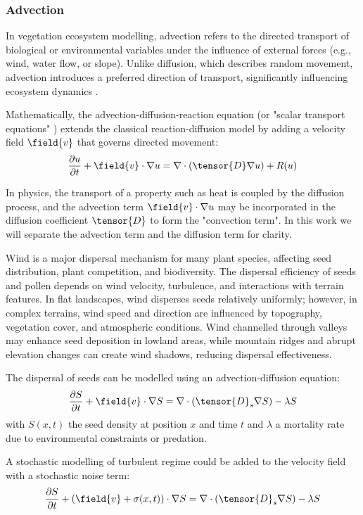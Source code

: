 \subsubsection{Advection}
In vegetation ecosystem modelling, advection refers to the directed transport of biological or environmental variables under the influence of external forces (e.g., wind, water flow, or slope). Unlike diffusion, which describes random movement, advection introduces a preferred direction of transport, significantly influencing ecosystem dynamics \cite{Burger2020}.

Mathematically, the advection-diffusion-reaction equation (or "scalar transport equations" \cite{Baukal2000}) extends the classical reaction-diffusion model by adding a velocity field $\field{v}$ that governs directed movement:
\begin{align}
    \frac{\partial u}{\partial t} + \field{v} \cdot \nabla u = \nabla \cdot \left( \tensor{D} \nabla u \right) + R(u)
\end{align}

In physics, the transport of a property such as heat is coupled by the diffusion process, and the advection term $\field{v} \cdot \nabla u$ may be incorporated in the diffusion coefficient $\tensor{D}$ to form the "convection term". In this work we will separate the advection term and the diffusion term for clarity.

Wind is a major dispersal mechanism for many plant species, affecting seed distribution, plant competition, and biodiversity. The dispersal efficiency of seeds and pollen depends on wind velocity, turbulence, and interactions with terrain features. In flat landscapes, wind disperses seeds relatively uniformly; however, in complex terrains, wind speed and direction are influenced by topography, vegetation cover, and atmospheric conditions. Wind channelled through valleys may enhance seed deposition in lowland areas, while mountain ridges and abrupt elevation changes can create wind shadows, reducing dispersal effectiveness.

The dispersal of seeds can be modelled using an advection-diffusion equation:
\begin{align}
    \frac{\partial S}{\partial t} + \field{v} \cdot \nabla S = \nabla \cdot (\tensor{D}_s \nabla S) - \lambda S
\end{align}
with $S(x, t)$ the seed density at position $x$ and time $t$ and $\lambda$ a mortality rate due to environmental constraints or predation.

A stochastic modelling of turbulent regime could be added to the velocity field with a stochastic noise term:
\begin{align}
    \frac{\partial S}{\partial t} + (\field{v} + \sigma(x, t)) \cdot \nabla S = \nabla \cdot (\tensor{D}_s \nabla S) - \lambda S
\end{align}

